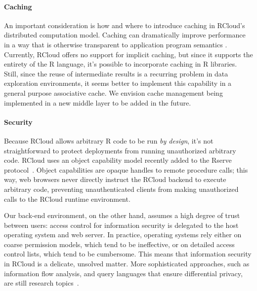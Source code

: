\paragraph*{Caching}
An important consideration is how and where to introduce caching in
RCloud's distributed computation model. Caching can dramatically
improve performance in a way that is otherwise transparent to
application program semantics \cite{Callahan:2006:VVM, Guo:2010:TPI}.
Currently, RCloud offers no support for implicit caching, but since it
supports the entirety of the R language, it's possible to incorporate
caching in R libraries.  Still, since the reuse of intermediate
results is a recurring problem in data exploration environments, it
seems better to implement this capability in a general purpose
associative cache. We envision cache management being implemented in a
new middle layer to be added in the future.

\paragraph*{Security}
Because RCloud allows arbitrary R code to be run
\emph{by design}, it's not straightforward to protect deployments
from running unauthorized arbitrary code. RCloud uses an object capability model
\cite{Miller:2006:RCT} recently added to the Rserve
protocol~\cite{Urbanek:2003:AFW}. Object capabilities are opaque handles
to remote procedure calls; this way, web browsers never directly instruct the
RCloud backend to execute arbitrary code, preventing unauthenticated clients
from making unauthorized calls to the RCloud runtime environment.

Our back-end environment, on the other hand, assumes a high degree of trust between users:
access control for information security is delegated to the host
operating system and web server. In practice, operating
systems rely either on coarse permission models,
which tend to be ineffective, or on detailed access control
lists, which tend to be cumbersome. This means that information security
in RCloud is a delicate, unsolved matter. More
sophisticated approaches, such as information flow analysis,
and query languages that ensure differential privacy, are
still research topics~\cite{Moore:2011:SAF}.

